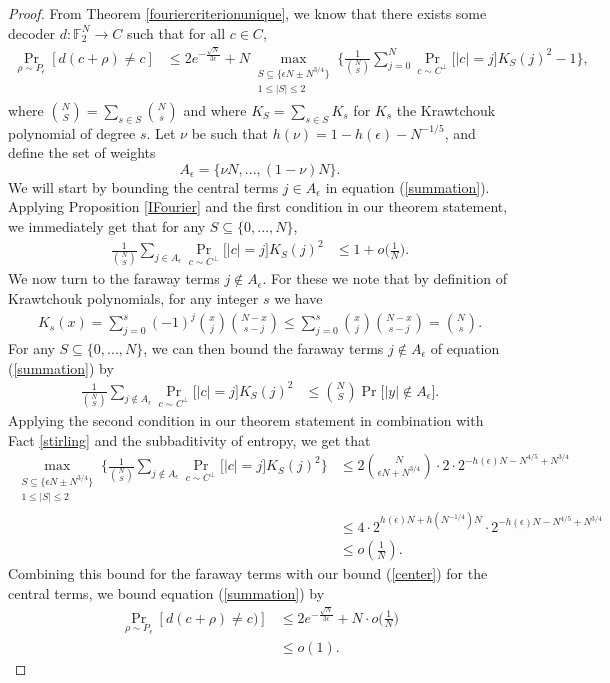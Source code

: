 \documentclass[12pt]{article}
\newcommand{\F}{\mathbb{F}}
\begin{document}
\begin{proof}
From Theorem \ref{fouriercriterionunique}, we know that there exists some decoder $d:\F_2^N\rightarrow C$ such that for all $c\in C$,
\begin{align}\label{summation}
    \Pr_{\rho\sim P_\epsilon}[ d(c+\rho)\neq c]&\leq 2e^{-\frac{\sqrt{N}}{3\epsilon}}+N \mathop{\max}_{\substack{S\subseteq \{\epsilon N\pm N^{3/4}\} \\
    1\leq|S|\leq 2}} \Big\{ \frac{1}{\binom{N}{S}}\sum_{j=0}^N \Pr_{c\sim C^\perp}\big[|c|=j\big] K_S(j)^2-1 \Big\},
\end{align}
where $\binom{N}{S}=\sum_{s\in S}\binom{N}{s}$ and where $K_S=\sum_{s\in S}K_s$ for $K_s$ the Krawtchouk polynomial of degree $s$. 
Let $\nu$ be such that $h(\nu)=1-h(\epsilon)-N^{-1/5}$, and define the set of weights
$$A_\epsilon=\{\nu N,...,(1-\nu)N\}.$$
We will start by bounding the central terms $j\in A_\epsilon$ in equation (\ref{summation}). Applying Proposition \ref{IFourier} and the first condition in our theorem statement, we immediately get that for any $S\subseteq \{0,...,N\}$,
\begin{align}\label{center}
    \frac{1}{\binom{N}{S}}\sum_{j\in A_\epsilon} \Pr_{c\sim C^\perp}\big[|c|=j\big] K_S(j)^2&\leq 1+o\big(\frac{1}{N}\big).
\end{align}
We now turn to the faraway terms $j\notin A_\epsilon$. For these we note that by definition of Krawtchouk polynomials, for any integer $s$ we have
\begin{align*}
    K_s(x)=\sum_{j=0}^s(-1)^j\binom{x}{j}\binom{N-x}{s-j} \leq\sum_{j=0}^s\binom{x}{j}\binom{N-x}{s-j}  =\binom{N}{s}.
\end{align*}
For any $S\subseteq \{0,...,N\}$, we can then bound the faraway terms $j\notin A_\epsilon$ of equation (\ref{summation}) by
\begin{align*}
\frac{1}{\binom{N}{S}}\sum_{j\notin A_\epsilon} \Pr_{c\sim C^\perp}\big[|c|=j\big] K_S(j)^2&\leq\binom{N}{S}\Pr\big[ |y|\notin A_\epsilon\big].
\end{align*}
Applying the second condition in our theorem statement in combination with Fact \ref{stirling} and the subbaditivity of entropy, we get that 
\begin{align*}
\mathop{\max}_{\substack{S\subseteq \{\epsilon N\pm N^{3/4}\} \\
    1\leq|S|\leq 2}} \Big\{ \frac{1}{\binom{N}{S}}\sum_{j\notin A_\epsilon} \Pr_{c\sim C^\perp}\big[|c|=j\big] K_S(j)^2\Big\}&\leq 2\binom{N}{\epsilon N+N^{3/4}}\cdot 2\cdot2^{-h(\epsilon)N-N^{4/5}+N^{3/4}}\nonumber\\
&\leq 4\cdot 2^{h(\epsilon)N+h(N^{-1/4})N}\cdot 2^{-h(\epsilon)N-N^{4/5}+N^{3/4}}\nonumber\\
&\leq o(\frac{1}{N}).
\end{align*}
Combining this bound for the faraway terms with our bound (\ref{center}) for the central terms, we bound equation (\ref{summation}) by
\begin{align*}
\Pr_{\rho\sim P_\epsilon}[ d(c+\rho)\neq c)]&\leq    2e^{-\frac{\sqrt{N}}{3\epsilon}}+N\cdot o\big(\frac{1}{N}\big)\\
&\leq o(1).
\end{align*}


\end{proof}
\end{document}
